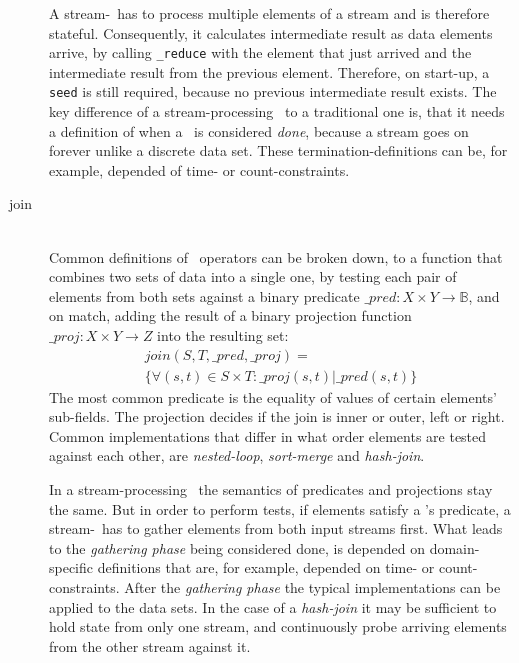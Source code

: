 \begin{description}
	A stream-\reduce\ has to process multiple elements of a stream and is therefore stateful.	Consequently, it calculates intermediate result as data elements arrive, by calling \texttt{\_reduce} with the element that just arrived and the intermediate result from the previous element. Therefore, on start-up, a \texttt{seed} is still required, because no previous intermediate result exists. The key difference of a stream-processing \reduce\ to a traditional one is, that it needs a definition of when a \reduce\ is considered \textsl{done}, because a stream goes on forever unlike a discrete data set. These termination-definitions can be, for example, depended of time- or count-constraints.
	\item[join] \hfill \\
  Common definitions of \join\ operators \cite{Wiki:JoinSQL, Wiki:JoinRA} can be broken down, to a function that combines two sets of data into a single one, by testing each pair of elements from both sets against a binary predicate $ \_pred : X \times Y \rightarrow \mathbb{B}$, and on match, adding the result of a binary projection function $ \_proj : X \times Y \rightarrow Z $ into the resulting set:
\begin{equation*}
	\begin{split}
	join(S,T,\_pred,\_proj)= \\
	\{\forall (s,t) \in S\times T : \_proj(s,t) | \_pred(s,t)\}
	\end{split}
\end{equation*}
The most common predicate is the equality of values of certain elements' sub-fields. The projection decides if the join is inner or outer, left or right. Common implementations that differ in what order elements are tested against each other, are \textsl{nested-loop}, \textsl{sort-merge} and \textsl{hash-join}.

In a stream-processing \join\ the semantics of predicates and projections stay the same. But in order to perform tests, if elements satisfy a \join 's predicate, a stream-\join\ has to gather elements from both input streams first. What leads to the \textsl{gathering phase} being considered done, is depended on domain-specific definitions that are, for example, depended on time- or count-constraints. After the \textsl{gathering phase} the typical implementations can be applied to the data sets. In the case of a \textsl{hash-join} it may be sufficient to hold state from only one stream, and continuously probe arriving elements from the other stream against it.


\end{description}
